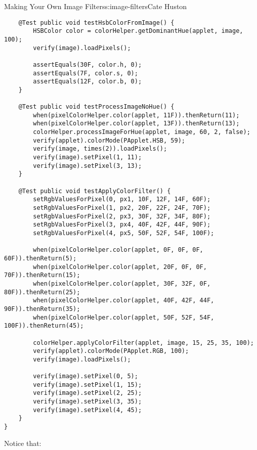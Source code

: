 \begin{aosachapter}{Making Your Own Image Filters}{s:image-filters}{Cate Huston}
\begin{verbatim}
    @Test public void testHsbColorFromImage() {
        HSBColor color = colorHelper.getDominantHue(applet, image, 100);
        verify(image).loadPixels();

        assertEquals(30F, color.h, 0);
        assertEquals(7F, color.s, 0);
        assertEquals(12F, color.b, 0);
    }

    @Test public void testProcessImageNoHue() {
        when(pixelColorHelper.color(applet, 11F)).thenReturn(11);
        when(pixelColorHelper.color(applet, 13F)).thenReturn(13);
        colorHelper.processImageForHue(applet, image, 60, 2, false);
        verify(applet).colorMode(PApplet.HSB, 59);
        verify(image, times(2)).loadPixels();
        verify(image).setPixel(1, 11);
        verify(image).setPixel(3, 13);
    }

    @Test public void testApplyColorFilter() {
        setRgbValuesForPixel(0, px1, 10F, 12F, 14F, 60F);
        setRgbValuesForPixel(1, px2, 20F, 22F, 24F, 70F);
        setRgbValuesForPixel(2, px3, 30F, 32F, 34F, 80F);
        setRgbValuesForPixel(3, px4, 40F, 42F, 44F, 90F);
        setRgbValuesForPixel(4, px5, 50F, 52F, 54F, 100F);

        when(pixelColorHelper.color(applet, 0F, 0F, 0F, 60F)).thenReturn(5);
        when(pixelColorHelper.color(applet, 20F, 0F, 0F, 70F)).thenReturn(15);
        when(pixelColorHelper.color(applet, 30F, 32F, 0F, 80F)).thenReturn(25);
        when(pixelColorHelper.color(applet, 40F, 42F, 44F, 90F)).thenReturn(35);
        when(pixelColorHelper.color(applet, 50F, 52F, 54F, 100F)).thenReturn(45);

        colorHelper.applyColorFilter(applet, image, 15, 25, 35, 100);
        verify(applet).colorMode(PApplet.RGB, 100);
        verify(image).loadPixels();

        verify(image).setPixel(0, 5);
        verify(image).setPixel(1, 15);
        verify(image).setPixel(2, 25);
        verify(image).setPixel(3, 35);
        verify(image).setPixel(4, 45);
    }
}
\end{verbatim}

Notice that:

\begin{aosaitemize}


\end{aosaitemize}
\end{aosachapter}
